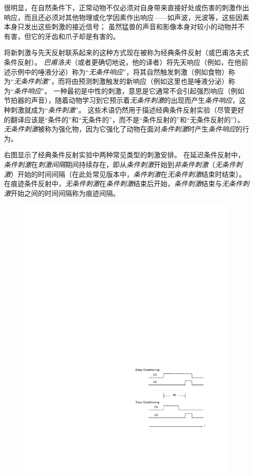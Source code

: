 很明显，在自然条件下，正常动物不仅必须对自身带来直接好处或伤害的刺激作出响应，而且还必须对其他物理或化学因素作出响应——如声波，光波等，这些因素本身只发出这些刺激的接近信号；
虽然猛兽的声音和影像本身对较小的动物并不有害，但它的牙齿和爪子却是有害的。


将新刺激与先天反射联系起来的这种方式现在被称为经典条件反射（或巴甫洛夫式条件反射）。
\textit{巴甫洛夫}（或者更确切地说，他的译者）将先天响应（例如，在他前述示例中的唾液分泌）称为“\textit{无条件响应}”，将其自然触发刺激（例如食物）称为“\textit{无条件刺激}”，而将由预测刺激触发的新响应（例如这里也是唾液分泌）称为“\textit{条件响应}”。
一种最初是中性的刺激，意思是它通常不会引起强烈响应（例如节拍器的声音），随着动物学习到它预示着\textit{无条件刺激}的出现而产生\textit{条件响应}，这种刺激就成为“\textit{条件刺激}”。
这些术语仍然用于描述经典条件反射实验（尽管更好的翻译应该是“条件的”和“无条件的”，而不是“条件反射的”和“无条件反射的”）。
\textit{无条件刺激}被称为强化物，因为它强化了动物在面对\textit{条件刺激}时产生\textit{条件响应}的行为。


右图显示了经典条件反射实验中两种常见类型的刺激安排。
在延迟条件反射中，\textit{条件刺激}在\textit{刺激间隔}期间持续存在，即从\textit{条件刺激}开始到\textit{非条件刺激}（\textit{无条件刺激}）开始的时间间隔（在此处常见版本中，\textit{条件刺激}在\textit{无条件刺激}结束时结束）。
在痕迹条件反射中，\textit{无条件刺激}在\textit{条件刺激}结束后开始，\textit{条件刺激}结束与\textit{无条件刺激}开始之间的时间间隔称为痕迹间隔。


\begin{figure}[!htb]
	\centering
	\includegraphics[width=0.5\linewidth]{chap11/fig_11_0}
	\caption{  \label{fig:11_0}}
\end{figure}


